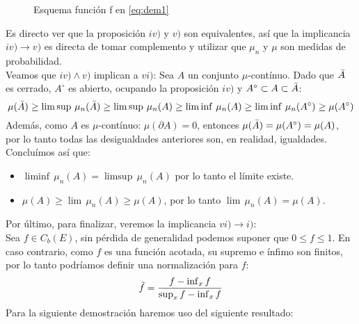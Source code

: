 \documentclass[a4paper]{article}
\numberwithin{equation}{subsection}
\begin{document}
\begin{figure}
\centering
    \caption{Esquema función f en \ref{eq:dem1}}
\end{figure}
\newline
Es directo ver que la proposición $iv)$ y $v)$ son equivalentes, así que la implicancia $iv) \rightarrow v)$ es directa de tomar complemento y utilizar que $\mu_n$ y $\mu$ son medidas de probabilidad.\\ \newline
Veamos que $iv)\land v)$ implican a $vi)$: Sea $A$ un conjunto $\mu$-contínuo. Dado que $\Bar{A}$ es cerrado, $A^{\circ}$ es abierto, ocupando la proposición $iv)$ y $A^{\circ} \subset A\subset \Bar{A}$:
\[\mu(\Bar{A}) \geq \limsup\,\mu_n(\Bar{A}) \geq \limsup\,\mu_n(A)\geq \liminf\,\mu_n(A) \geq \liminf\,\mu_n(A^{\circ})\geq \mu(A^{\circ})\]
Además, como $A$ es $\mu$-contínuo: $\mu(\partial A) = 0$, entonces $\mu(\Bar{A}) = \mu(A^{\circ}) = \mu(A)$, por lo tanto todas las desigualdades anteriores son, en realidad, igualdades. Concluímos así que:
\begin{itemize}
    \item $\liminf\,\mu_n(A) = \limsup\,\mu_n(A)$ por lo tanto el límite existe.
    \item $\mu(A)\geq \lim\,\mu_n(A)\geq \mu(A)$, por lo tanto $\lim\,\mu_n(A) = \mu(A)$.
\end{itemize}
Por último, para finalizar, veremos la implicancia $vi)\rightarrow i)$:\\ \newline
Sea $f\in C_b(E)$, sin pérdida de generalidad podemos suponer que $0\leq f\leq 1$. En caso contrario, como $f$ es una función acotada, su supremo e ínfimo son finitos, por lo tanto podríamos definir una normalización para $f$:
\[\Tilde{f} = \frac{f - \inf_x f}{\sup_x f - \inf_x f}\]
Para la siguiente demostración haremos uso del siguiente resultado:
\end{document}
